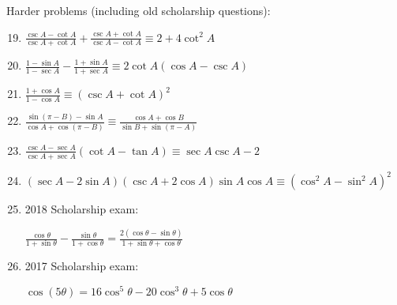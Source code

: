 \documentclass[../main.tex]{subfiles}
\begin{document}
Harder problems (including old scholarship questions):
\begin{enumerate}
    \setcounter{enumi}{18}
    \item $\frac{\csc{A}-\cot{A}}{\csc{A}+\cot{A}}+\frac{\csc{A}+\cot{A}}{\csc{A}-\cot{A}}\equiv 2+4\cot^2{A}$
    
    \item $\frac{1-\sin{A}}{1-\sec{A}}-\frac{1+\sin{A}}{1+\sec{A}}\equiv 2\cot{A}(\cos{A}-\csc{A})$
    
    \item $\frac{1+\cos{A}}{1-\cos{A}}\equiv (\csc{A}+\cot{A})^2$
    
    \item $\frac{\sin{(\pi-B)}-\sin{A}}{\cos{A}+\cos{(\pi - B)}}\equiv \frac{\cos{A}+\cos{B}}{\sin{B}+\sin{(\pi - A)}}$
    
    \item $\frac{\csc{A}-\sec{A}}{\csc{A}+\sec{A}}(\cot{A}-\tan{A})\equiv \sec{A}\csc{A}-2$
    
    \item $(\sec{A}-2\sin{A})(\csc{A}+2\cos{A})\sin{A}\cos{A}\equiv (\cos^2{A}-\sin^2{A})^2$
    
    \item 2018 Scholarship exam:
    
    $\frac{\cos{\theta}}{1+\sin{\theta}}-\frac{\sin{\theta}}{1+\cos{\theta}}=\frac{2(\cos{\theta}-\sin{\theta})}{1+\sin{\theta}+\cos{\theta}}$

    \item 2017 Scholarship exam:
    
    $\cos{(5\theta)}=16\cos^5{\theta}-20\cos^3{\theta}+5\cos{\theta}$
\end{enumerate}
\end{document}
